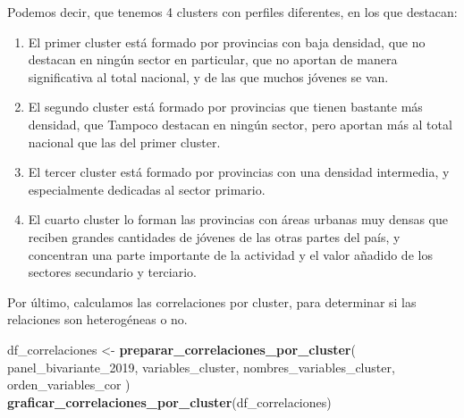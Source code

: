 \documentclass[,article,submit,moreauthors,pdftex]{Definitions/mdpi}
\newenvironment{Shaded}{\begin{snugshade}}{\end{snugshade}}
\newcommand{\FunctionTok}[1]{\textcolor[rgb]{0.13,0.29,0.53}{\textbf{#1}}}
\newcommand{\NormalTok}[1]{#1}
\newcommand{\OtherTok}[1]{\textcolor[rgb]{0.56,0.35,0.01}{#1}}
\begin{document}
\begin{table}[!h]
\centering
\caption{\label{tab:unnamed-chunk-12}Perfil de estructura productiva por Cluster }
\centering
{}
\end{table}

Podemos decir, que tenemos 4 clusters con perfiles diferentes, en los
que destacan:

\begin{enumerate}
\def\labelenumi{\arabic{enumi}.}
\item
  El primer cluster está formado por provincias con baja densidad, que
  no destacan en ningún sector en particular, que no aportan de manera
  significativa al total nacional, y de las que muchos jóvenes se van.
\item
  El segundo cluster está formado por provincias que tienen bastante más
  densidad, que Tampoco destacan en ningún sector, pero aportan más al
  total nacional que las del primer cluster.
\item
  El tercer cluster está formado por provincias con una densidad
  intermedia, y especialmente dedicadas al sector primario.
\item
  El cuarto cluster lo forman las provincias con áreas urbanas muy
  densas que reciben grandes cantidades de jóvenes de las otras partes
  del país, y concentran una parte importante de la actividad y el valor
  añadido de los sectores secundario y terciario.
\end{enumerate}

Por último, calculamos las correlaciones por cluster, para determinar si
las relaciones son heterogéneas o no.

\begin{Shaded}
\begin{Highlighting}[]
\NormalTok{df\_correlaciones }\OtherTok{\textless{}{-}} \FunctionTok{preparar\_correlaciones\_por\_cluster}\NormalTok{(}
\NormalTok{  panel\_bivariante\_2019,}
\NormalTok{  variables\_cluster,}
\NormalTok{  nombres\_variables\_cluster,}
\NormalTok{  orden\_variables\_cor}
\NormalTok{)}
\FunctionTok{graficar\_correlaciones\_por\_cluster}\NormalTok{(df\_correlaciones)}
\end{Highlighting}
\end{Shaded}
\end{document}

